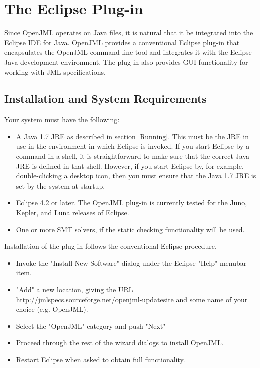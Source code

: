 \chapter{The Eclipse Plug-in}
\label{EclipsePlugin}

Since OpenJML operates on Java files, it is natural that it be integrated into the Eclipse IDE for Java.
OpenJML provides a conventional Eclipse plug-in that encapsulates the OpenJML command-line tool and integrates it
with the Eclipse Java development environment. The plug-in also provides GUI functionality for working with JML specifications.

\section{Installation and System Requirements}
Your system must have the following:
\begin{itemize}
\item A Java 1.7 JRE as described in section \ref{Running}. This must be the JRE in use in the environment in which Eclipse is invoked. If you start Eclipse by a command in a shell, it is straightforward to make sure that the correct Java JRE is defined in that shell.  However, if you start Eclipse by, for example, double-clicking a desktop icon, then you must ensure that the Java 1.7 JRE is set by the system at startup.
\item Eclipse 4.2 or later. The OpenJML plug-in is currently tested for the Juno, Kepler, and Luna releases of Eclipse.
\item One or more SMT solvers, if the static checking functionality will be used.
\end{itemize}

Installation of the plug-in follows the conventional Eclipse procedure.
\begin{itemize}
\item Invoke the "Install New Software" dialog under the Eclipse "Help" menubar item.
\item "Add" a new location, giving the URL \url{http://jmlspecs.sourceforge.net/openjml-updatesite} and some name of your choice (e.g. OpenJML).
\item Select the "OpenJML" category and push "Next"
\item Proceed through the rest of the wizard dialogs to install OpenJML.
\item Restart Eclipse when asked to obtain full functionality.
\end{itemize}

